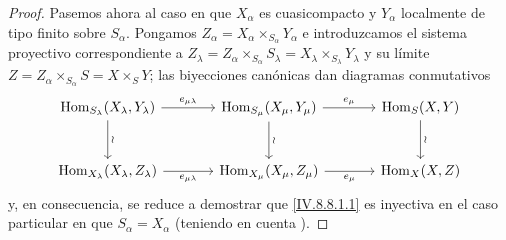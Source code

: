 \begin{proof}
Pasemos ahora al caso en que $X_\alpha$ es cuasicompacto y $Y_\alpha$ localmente de tipo finito sobre $S_\alpha$.
Pongamos $Z_\alpha=X_\alpha\times_{S_\alpha}Y_\alpha$ e introduzcamos el sistema proyectivo correspondiente a $Z_\lambda=Z_\alpha\times_{S_\alpha}S_\lambda=
X_\lambda\times_{S_\lambda}Y_\lambda$ y su límite $Z=Z_\alpha\times_{S_\alpha}S=X\times_S Y$; las biyecciones canónicas  dan diagramas conmutativos
\[
\begin{tikzcd}[column sep=large,row sep=large]
\operatorname{Hom}_{S_\lambda}(X_\lambda,Y_\lambda)
  \ar[r,"e_{\mu\lambda}"] \ar[d,"\wr"] &
\operatorname{Hom}_{S_\mu}(X_\mu,Y_\mu)
  \ar[r,"e_\mu"] \ar[d,"\wr"] &
\operatorname{Hom}_S(X,Y) \ar[d,"\wr"] \\
\operatorname{Hom}_{X_\lambda}(X_\lambda,Z_\lambda)
  \ar[r,"e_{\mu\lambda}"'] &
\operatorname{Hom}_{X_\mu}(X_\mu,Z_\mu)
  \ar[r,"e_\mu"'] &
\operatorname{Hom}_X(X,Z)
\end{tikzcd}
\]
y, en consecuencia, se reduce a demostrar que \eqref{IV.8.8.1.1} es inyectiva en el caso particular en que $S_\alpha=X_\alpha$ (teniendo en cuenta ).

\end{proof}
